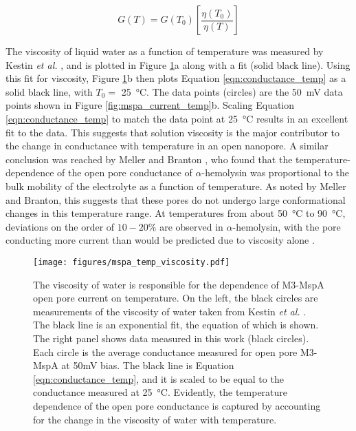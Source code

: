 \begin{equation}
G(T) = G(T_0) \left[ \frac{\eta(T_0)}{\eta(T)} \right]
\label{eqn:conductance_temp}
\end{equation}

The viscosity of liquid water as a function of temperature was measured by Kestin \textit{et al.} \cite{Kestin1978}, and is plotted in Figure \ref{fig:mspa_current_temp_viscosity}a along with a fit (solid black line).  Using this fit for viscosity, Figure \ref{fig:mspa_current_temp_viscosity}b then plots Equation \ref{eqn:conductance_temp} as a solid black line, with $T_0=$ \SI{25}{\degreeCelsius}.  The data points (circles) are the \SI{50}{\mV} data points shown in Figure \ref{fig:mspa_current_temp}b.  Scaling Equation \ref{eqn:conductance_temp} to match the data point at \SI{25}{\degreeCelsius} results in an excellent fit to the data.  This suggests that solution viscosity is the major contributor to the  change in conductance with temperature in an open nanopore.  A similar conclusion was reached by Meller and Branton \citep{Meller2002}, who found that the temperature-dependence of the open pore conductance of $\alpha$-hemolysin was proportional to the bulk mobility of the electrolyte as a function of temperature.  As noted by Meller and Branton, this suggests that these pores do not undergo large conformational changes in this temperature range.  At temperatures from about \SI{50}{\degreeCelsius} to \SI{90}{\degreeCelsius}, deviations on the order of $10-20\%$ are observed in $\alpha$-hemolysin, with the pore conducting more current than would be predicted due to viscosity alone \citep{Kang2005}.

\begin{figure}[h]
\begin{centering}
\texttt{[image: figures/mspa\_temp\_viscosity.pdf]}
\caption[MspA current versus temperature explained by viscosity]{The viscosity of water is responsible for the dependence of M3-MspA open pore current on temperature.  On the left, the black circles are measurements of the viscosity of water taken from Kestin \textit{et al.} \cite{Kestin1978}.  The black line is an exponential fit, the equation of which is shown.  The right panel shows data measured in this work (black circles).  Each circle is the average conductance measured for open pore M3-MspA at 50mV bias.  The black line is Equation \ref{eqn:conductance_temp}, and it is scaled to be equal to the conductance measured at \SI{25}{\degreeCelsius}.  Evidently, the temperature dependence of the open pore conductance is captured by accounting for the change in the viscosity of water with temperature.}
\label{fig:mspa_current_temp_viscosity}
\end{centering}
\end{figure}

